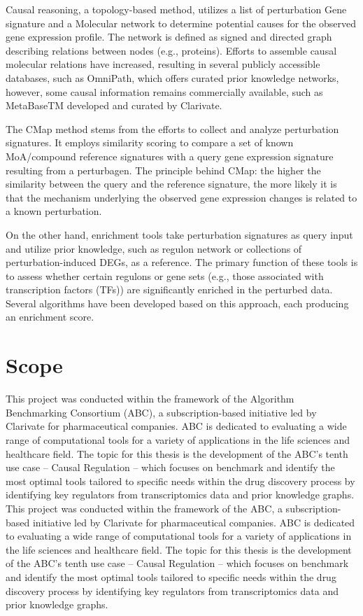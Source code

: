 Causal reasoning, a topology-based method, utilizes a list of perturbation \gls{Gene signature} and a \gls{Molecular network} to determine potential causes for the observed gene expression profile. The network is defined as signed and directed graph describing relations between nodes (e.g., proteins). Efforts to assemble causal molecular relations have increased, resulting in several publicly accessible databases, such as OmniPath, which offers curated prior knowledge networks, however, some causal information remains commercially available, such as MetaBaseTM developed and curated by Clarivate.

The \gls{CMap} method stems from the efforts to collect and analyze perturbation signatures. It employs similarity scoring to compare a set of known MoA/compound reference signatures with a query gene expression signature resulting from a perturbagen. The principle behind CMap: the higher the similarity between the query and the reference signature, the more likely it is that the mechanism underlying the observed gene expression changes is related to a known perturbation.

On the other hand, enrichment tools take perturbation signatures as query input and utilize prior knowledge, such as regulon network or collections of perturbation-induced \gls{DEGs}, as a reference. The primary function of these tools is to assess whether certain regulons or gene sets (e.g., those associated with transcription factors (TFs)) are significantly enriched in the perturbed data. Several algorithms have been developed based on this approach, each producing an enrichment score.


\section{Scope} %
\label{sec:scope}
This project was conducted within the framework of the Algorithm Benchmarking Consortium (ABC), a subscription-based initiative led by Clarivate for pharmaceutical companies. ABC is dedicated to evaluating a wide range of computational tools for a variety of applications in the life sciences and healthcare field. The topic for this thesis is the development of the ABC’s tenth use case – Causal Regulation – which focuses on benchmark and identify the most optimal tools tailored to specific needs within the drug discovery process by identifying key regulators from transcriptomics data and prior knowledge graphs.
This project was conducted within the framework of the \gls{ABC}, a subscription-based initiative led by Clarivate for pharmaceutical companies. \gls{ABC} is dedicated to evaluating a wide range of computational tools for a variety of applications in the life sciences and healthcare field. The topic for this thesis is the development of the ABC’s tenth use case – Causal Regulation – which focuses on benchmark and identify the most optimal tools tailored to specific needs within the drug discovery process by identifying key regulators from transcriptomics data and prior knowledge graphs.

